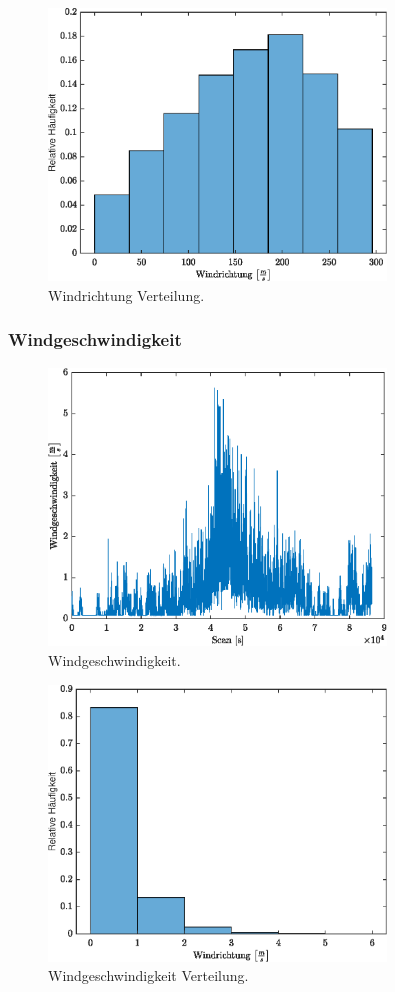 \begin{figure}[H]
	\centering
	\includegraphics[width=0.8\textwidth]{../DATA/WinddirCN.eps}
	\caption[Windrichtung Verteilung]{Windrichtung Verteilung.}
	\label{fig:winddirCN}
\end{figure}

\subsubsection{Windgeschwindigkeit}

\begin{figure}[H]
	\centering
	\includegraphics[width=0.8\textwidth]{../DATA/Windgeschwindigkeit.eps}
	\caption[Windgeschwindigkeit]{Windgeschwindigkeit.}
	\label{fig:windspd}
\end{figure}

\begin{figure}[H]
	\centering
	\includegraphics[width=0.8\textwidth]{../DATA/WindspdCN.eps}
	\caption[Windgeschwindigkeit Verteilung]{Windgeschwindigkeit Verteilung.}
	\label{fig:windspdCN}
\end{figure}
